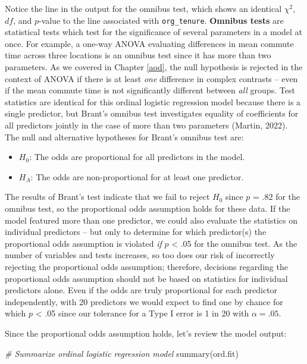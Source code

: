 \documentclass[
]{book}
\newenvironment{Shaded}{\begin{snugshade}}{\end{snugshade}}
\newcommand{\CommentTok}[1]{\textcolor[rgb]{0.56,0.35,0.01}{\textit{#1}}}
\newcommand{\FunctionTok}[1]{\textcolor[rgb]{0.00,0.00,0.00}{#1}}
\newcommand{\NormalTok}[1]{#1}
\providecommand{\tightlist}{%
  \setlength{\itemsep}{0pt}\setlength{\parskip}{0pt}}
\begin{document}
Notice the line in the output for the omnibus test, which shows an identical \(\chi^2\), \(df\), and \(p\)-value to the line associated with \texttt{org\_tenure}. \textbf{Omnibus tests} are statistical tests which test for the significance of several parameters in a model at once. For example, a one-way ANOVA evaluating differences in mean commute time across three locations is an omnibus test since it has more than two parameters. As we covered in Chapter \ref{aod}, the null hypothesis is rejected in the context of ANOVA if there is at least \emph{one} difference in complex contrasts -- even if the mean commute time is not significantly different between \emph{all} groups. Test statistics are identical for this ordinal logistic regression model because there is a single predictor, but Brant's omnibus test investigates equality of coefficients for all predictors jointly in the case of more than two parameters (Martin, 2022). The null and alternative hypotheses for Brant's omnibus test are:

\begin{itemize}
\tightlist
\item
  \(H_0\): The odds are proportional for all predictors in the model.
\item
  \(H_A\): The odds are non-proportional for at least one predictor.
\end{itemize}

The results of Brant's test indicate that we fail to reject \(H_0\) since \(p\) = .82 for the omnibus test, so the proportional odds assumption holds for these data. If the model featured more than one predictor, we could also evaluate the statistics on individual predictors -- but only to determine for which predictor(s) the proportional odds assumption is violated \emph{if} \(p\) \textless{} .05 for the omnibus test. As the number of variables and tests increases, so too does our risk of incorrectly rejecting the proportional odds assumption; therefore, decisions regarding the proportional odds assumption should not be based on statistics for individual predictors alone. Even if the odds are truly proportional for each predictor independently, with 20 predictors we would expect to find one by chance for which \(p\) \textless{} .05 since our tolerance for a Type I error is 1 in 20 with \(\alpha = .05\).

Since the proportional odds assumption holds, let's review the model output:

\begin{Shaded}
\begin{Highlighting}[]
\CommentTok{\# Summarize ordinal logistic regression model}
\FunctionTok{summary}\NormalTok{(ord.fit)}
\end{Highlighting}
\end{Shaded}
\end{document}
